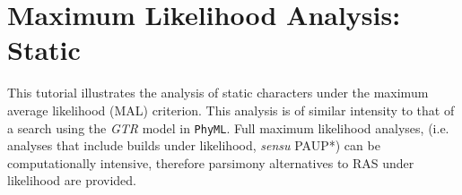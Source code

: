 


\section{Maximum Likelihood Analysis: Static}{\label{tutorial14}}

This tutorial illustrates the analysis of static characters under the 
maximum average likelihood (MAL) criterion. This analysis is 
of similar intensity to that of a search using the \emph{GTR} 
model in \texttt{PhyML}.  Full maximum likelihood analyses, 
(i.e. analyses that include builds under likelihood, \textit{sensu} 
PAUP*)  can be computationally intensive, therefore parsimony 
alternatives to RAS under likelihood are provided. 


